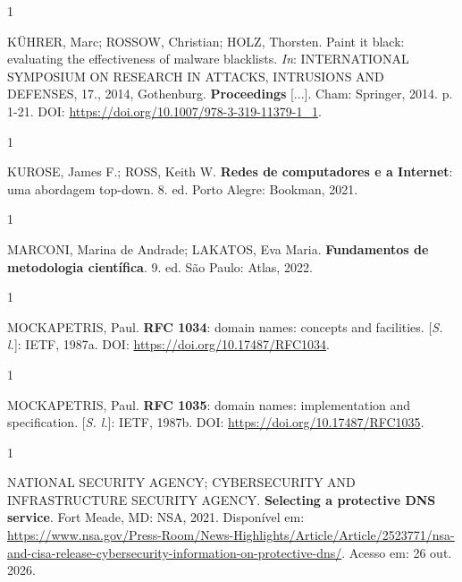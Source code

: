 \documentclass[12pt,a4paper]{article}
\begin{document}
\begin{spacing}{1}\raggedright\noindent KÜHRER, Marc; ROSSOW, Christian; HOLZ, Thorsten. Paint it black: evaluating the effectiveness of malware blacklists. \textit{In}: INTERNATIONAL SYMPOSIUM ON RESEARCH IN ATTACKS, INTRUSIONS AND DEFENSES, 17., 2014, Gothenburg. \textbf{Proceedings} [...]. Cham: Springer, 2014. p. 1-21. DOI: \url{https://doi.org/10.1007/978-3-319-11379-1_1}.\par\vspace{12pt}\end{spacing}
\begin{spacing}{1}\raggedright\noindent KUROSE, James F.; ROSS, Keith W. \textbf{Redes de computadores e a Internet}: uma abordagem top-down. 8. ed. Porto Alegre: Bookman, 2021.\par\vspace{12pt}\end{spacing}
\begin{spacing}{1}\raggedright\noindent MARCONI, Marina de Andrade; LAKATOS, Eva Maria. \textbf{Fundamentos de metodologia científica}. 9. ed. São Paulo: Atlas, 2022.\par\vspace{12pt}\end{spacing}
\begin{spacing}{1}\raggedright\noindent MOCKAPETRIS, Paul. \textbf{RFC 1034}: domain names: concepts and facilities. [\textit{S. l.}]: IETF, 1987a. DOI: \url{https://doi.org/10.17487/RFC1034}.\par\vspace{12pt}\end{spacing}
\begin{spacing}{1}\raggedright\noindent MOCKAPETRIS, Paul. \textbf{RFC 1035}: domain names: implementation and specification. [\textit{S. l.}]: IETF, 1987b. DOI: \url{https://doi.org/10.17487/RFC1035}.\par\vspace{12pt}\end{spacing}
\begin{spacing}{1}\raggedright\noindent NATIONAL SECURITY AGENCY; CYBERSECURITY AND INFRASTRUCTURE SECURITY AGENCY. \textbf{Selecting a protective DNS service}. Fort Meade, MD: NSA, 2021. Disponível em: \url{https://www.nsa.gov/Press-Room/News-Highlights/Article/Article/2523771/nsa-and-cisa-release-cybersecurity-information-on-protective-dns/}. Acesso em: 26 out. 2026.\par\vspace{12pt}\end{spacing}
\end{document}
